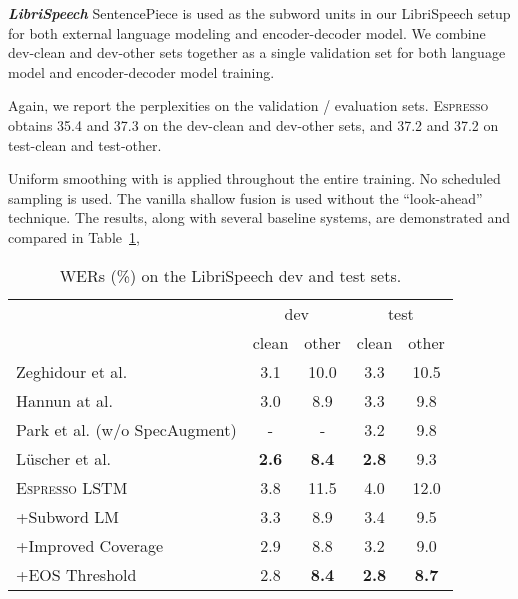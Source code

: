 \documentclass{article}
\def\espresso{\textsc{Espresso}\xspace}
\begin{document}
\vspace{0.2cm}
\noindent \textbf{\textit{LibriSpeech}}\quad
SentencePiece is used as the subword units in our LibriSpeech setup for both external language modeling and encoder-decoder model. We combine dev-clean and dev-other sets together as a single validation set for both language model and encoder-decoder model training.



Again, we report the perplexities on the validation / evaluation sets. \espresso obtains 35.4 and 37.3 on the dev-clean and dev-other sets, and 37.2 and 37.2 on test-clean and test-other.


Uniform smoothing with  is applied throughout the entire training. No scheduled sampling is used. The vanilla shallow fusion is used without the ``look-ahead'' technique.  The results, along with several baseline systems, are demonstrated and compared in Table~\ref{tab:librispeech_lstm}, 

\begin{table}[tb]
  \caption{WERs (\%) on the LibriSpeech dev and test sets.}
  \label{tab:librispeech_lstm}
  \centering
  \setlength\tabcolsep{3pt}
  \begin{adjustbox}{max width=\linewidth}
  \begin{tabular}{l c c c c}
    \toprule
    
    & \multicolumn{2}{c}{dev} & \multicolumn{2}{c}{test} \\
    \cmidrule(lr){2-3} \cmidrule(lr){4-5}
    & clean &  other & clean & other \\
    \midrule
Zeghidour et al. \cite{zeghidour2018fully} & 3.1 & 10.0 & 3.3 & 10.5 \\
    Hannun at al. \cite{hannun2019sequence} & 3.0 & 8.9 & 3.3 & 9.8 \\
    Park et al. \cite{specaugment} (w/o SpecAugment) & - & - & 3.2 & 9.8 \\
L{\"{u}}scher et al. \cite{luscher2019hybrid} & \bf 2.6 & \bf 8.4 & \bf 2.8 & 9.3 \\
    \midrule
    \espresso LSTM & 3.8 & 11.5 & 4.0 & 12.0 \\
    \quad+Subword LM & 3.3 & 8.9 & 3.4 & 9.5 \\
    \quad\quad+Improved Coverage & 2.9 & 8.8 & 3.2 & 9.0 \\
    \quad\quad+EOS Threshold & 2.8 & \bf 8.4 & \bf 2.8 & \bf 8.7 \\
    \bottomrule
  \end{tabular}
  \end{adjustbox}
\end{table}
\end{document}
